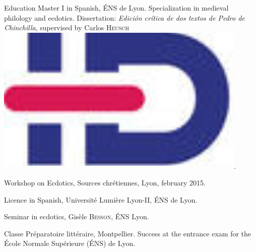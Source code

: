 \begin{rubric}{Education}
                                \entry*[2014-2015]
                            Master I in Spanish, ÉNS de Lyon. Specialization in
                        medieval philology and ecdotics. Dissertation:
                            \textit{Edición crítica de dos textos de Pedro de
                            Chinchilla}, supervised by Carlos
                        \textsc{Heusch}\href{https://www.idref.fr/055838413}{\textsuperscript{\includegraphics[scale=0.025]{img/idref.png}}}.
                    
                                \entry*
                            Workshop on Ecdotics, Sources chrétiennes, Lyon,
                        february 2015.
                    
                                \entry*[2013-2014]
                            Licence in Spanish, Université Lumière Lyon-II, ÉNS
                        de Lyon.
                    
                                \entry*
                            Seminar in ecdotics, Gisèle
                            \textsc{Besson}, ÉNS Lyon.
                    
                                \entry*[2011-2013]
                            Classe Préparatoire littéraire, Montpellier.
                        Success at the entrance exam for the École Normale
                        Supérieure (ÉNS) de Lyon.
                    \end{rubric}





